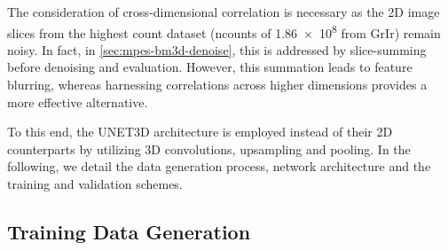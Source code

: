 The consideration of cross-dimensional correlation is necessary as the 2D image slices from the highest count dataset (\gls{ncounts} of \num{1.86e8} from \gls{GrIr}) remain noisy. In fact, in \cref{sec:mpes-bm3d-denoise}, this is addressed by slice-summing before denoising and evaluation. However, this summation leads to feature blurring, whereas harnessing correlations across higher dimensions provides a more effective alternative.

To this end, the UNET3D architecture is employed instead of their 2D counterparts by utilizing 3D convolutions, upsampling and pooling. In the following, we detail the data generation process, network architecture and the training and validation schemes.

\subsection{Training Data Generation}
